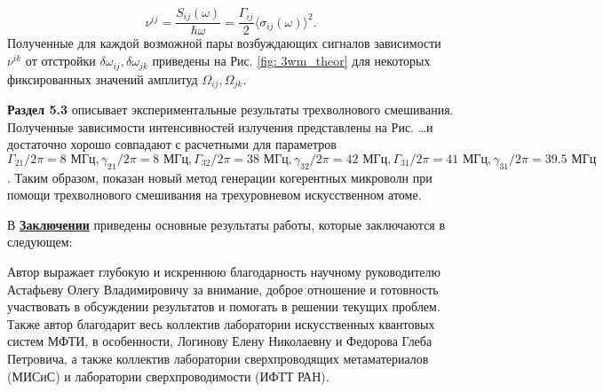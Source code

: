 \begin{equation}
\nu^{ij}=\frac{S_{ij}(\omega)}{\hbar\omega} = \frac{\Gamma_{ij}}{2}\langle\sigma_{ij}(\omega)\rangle^2.
\end{equation}
Полученные для каждой возможной пары возбуждающих сигналов зависимости $\nu^{ik}$ от отстройки $\delta\omega_{ij}, \delta\omega_{jk}$ приведены на Рис. \ref{fig: 3wm_theor} для некоторых фиксированных значений амплитуд $\Omega_{ij}, \Omega_{jk}$. 

\textbf{Раздел 5.3} описывает экспериментальные результаты трехволнового смешивания. Полученные зависимости интенсивностей излучения представлены на Рис. \ldots и достаточно хорошо совпадают с расчетными для параметров $\Gamma_{21}/2\pi = 8 \text{ МГц}, \gamma_{21}/2\pi = 8 \text{ МГц}, \Gamma_{32}/2\pi = 38 \text{ МГц}, \gamma_{32}/2\pi = 42 \text{ МГц}, \Gamma_{31}/2\pi = 41 \text{ МГц}, \gamma_{31}/2\pi = 39.5 \text{ МГц} $. Таким образом, показан новый метод генерации когерентных микроволн при помощи трехволнового смешивания на трехуровневом искусственном атоме.

%
%
В \underline{\textbf{Заключении}} приведены основные результаты работы, которые заключаются в следующем:


Автор выражает глубокую и искреннюю благодарность научному руководителю Астафьеву Олегу Владимировичу за внимание, доброе отношение и готовность участвовать в обсуждении результатов и помогать в решении текущих проблем. Также автор благодарит весь коллектив лаборатории искусственных квантовых систем МФТИ, в особенности, Логинову Елену Николаевну и Федорова Глеба Петровича, а также коллектив лаборатории сверхпроводящих метаматериалов (МИСиС) и лаборатории сверхпроводимости (ИФТТ РАН). 

